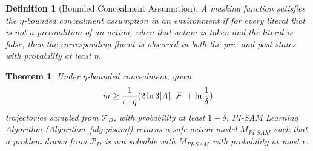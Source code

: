 \documentclass[letterpaper]{article} %
\newcommand{\tuple}[1]{\ensuremath{\left \langle #1 \right \rangle }}
\newcommand{\unobserved}{\textit{?}}
\newcommand{\pisam}{\textit{PI-SAM}\xspace}
\newcommand{\roni}[1]{ }
\newtheorem{theorem}{Theorem}
\newtheorem{definition}{Definition}
\newtheorem{observation}[theorem]{Observation}
\begin{document}


\begin{definition}[Bounded Concealment Assumption]
A masking function satisfies the {\em $\eta$-bounded concealment assumption} in an environment if for every literal that is not a precondition of an action, when that action is taken and the literal is false, then the corresponding fluent is observed in both the pre- and post-states with probability at least $\eta$. 

\end{definition}

\setcounter{theorem}{1}
\begin{theorem}\label{complexity-pisam-thm-appendix}
Under $\eta$-bounded concealment, given 
\begin{equation*}
    \small
m \geq \frac{1}{\epsilon \cdot\eta} (2\ln 3 |A|.{|\mathcal{F}|} + \ln \frac{1}{\delta})
\end{equation*}
trajectories sampled from $\mathcal{T}_D$, with probability at least $1-\delta $, 
PI-SAM Learning Algorithm (Algorithm~\ref{alg:pisam}) returns a safe action model $M_\pisam$ such that a problem drawn from $\mathcal{P}_D$ is not solvable with $M_\pisam$ with probability at most $\epsilon$.
\end{theorem}
\end{document}
